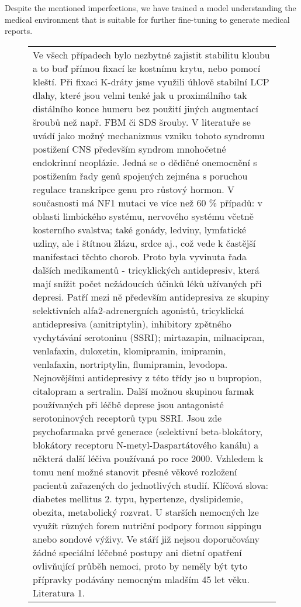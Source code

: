 Despite the mentioned imperfections, we have trained a model understanding the medical environment that is suitable for further fine-tuning to generate medical reports.
\begin{figure}[htb]
        \centering
            \begin{tabular}{|l|}
\hline
\parbox{14cm}{\vspace{0.25em}Ve všech případech bylo nezbytné zajistit stabilitu kloubu a to buď přímou fixací ke kostnímu krytu, nebo pomocí kleští. Při fixaci K-dráty jsme využili úhlově stabilní LCP dlahy, které jsou velmi tenké jak u proximálního tak distálního konce humeru bez použití jiných augmentací šroubů než např. FBM či SDS šrouby.\newline
V literatuře se uvádí jako možný mechanizmus vzniku tohoto syndromu postižení CNS především syndrom mnohočetné endokrinní neoplázie. Jedná se o dědičné onemocnění s postižením řady genů spojených zejména s poruchou regulace transkripce genu pro růstový hormon. V současnosti má NF1 mutaci ve více než 60 \% případů: v oblasti limbického systému, nervového systému včetně kosterního svalstva; také gonády, ledviny, lymfatické uzliny, ale i štítnou žlázu, srdce aj., což vede k častější manifestaci těchto chorob.\newline
Proto byla vyvinuta řada dalších medikamentů - tricyklických antidepresiv, která mají snížit počet nežádoucích účinků léků užívaných při depresi. Patří mezi ně především antidepresiva ze skupiny selektivních alfa2-adrenergních agonistů, tricyklická antidepresiva (amitriptylin), inhibitory zpětného vychytávání serotoninu (SSRI); mirtazapin, milnacipran, venlafaxin, duloxetin, klomipramin, imipramin, venlafaxin, nortriptylin, flumipramin, levodopa. Nejnovějšími antidepresivy z této třídy jso u bupropion, citalopram a sertralin. Další možnou skupinou farmak používaných při léčbě deprese jsou antagonisté serotoninových receptorů typu SSRI. Jsou zde psychofarmaka prvé generace (selektivní beta-blokátory, blokátory receptoru N-metyl-Daspartátového kanálu) a některá další léčiva používaná po roce 2000.\newline
Vzhledem k tomu není možné stanovit přesné věkové rozložení pacientů zařazených do jednotlivých studií. Klíčová slova: diabetes mellitus 2. typu, hypertenze, dyslipidemie, obezita, metabolický rozvrat.\newline
U starších nemocných lze využít různých forem nutriční podpory formou sippingu anebo sondové výživy. Ve stáří již nejsou doporučovány žádné speciální léčebné postupy ani dietní opatření ovlivňující průběh nemoci, proto by neměly být tyto přípravky podávány nemocným mladším 45 let věku. Literatura 1.\newline
}
\end{tabular}
\end{figure}
